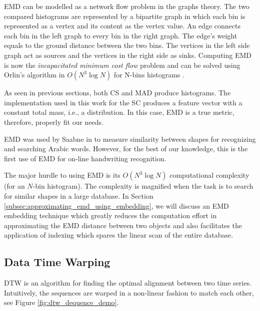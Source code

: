 \iftoggle{edit-mode}{\hspace{0pt}\marginpar{EMD modelling as flow in graph}}{}
EMD can be modelled as a network flow problem in the graphs theory. 
The two compared histograms are represented by a bipartite graph in which each bin is represented as a vertex and its content as the vertex value. 
An edge connects each bin in the left graph to every bin in the right graph. 
The edge's weight equals to the ground distance between the two bins. 
The vertices in the left side graph act as sources and the vertices in the right side as sinks. 
Computing EMD is now the \emph{incapacitated minimum cost flow} problem and can be solved using Orlin's algorithm in $O(N^3 \log N)$ for N-bins histograms \cite{shirdhonkar2008approximate}.

\iftoggle{edit-mode}{\hspace{0pt}\marginpar{EMD in Feature space}}{}
As seen in previous sections, both CS and MAD produce histograms. 
The implementation used in this work for the SC produces a feature vector with a constant total mass, i.e., a distribution. 
In this case, EMD is a true metric, therefore, properly fit our needs.

\iftoggle{edit-mode}{\hspace{0pt}\marginpar{EMD in handwriting recognition}}{}
EMD was used by Saabne in \cite{saabni2013efficient} to measure similarity between shapes for recognizing and searching Arabic words. 
However, for the best of our knowledge, this is the first use of EMD for on-line handwriting recognition.

\iftoggle{edit-mode}{\hspace{0pt}\marginpar{EMD drawback}}{}
The major hurdle to using EMD is its $O\left( {{N^3}\log N} \right)$ computational complexity (for an $N$-bin histogram). 
The complexity is magnified when the task is to search for similar shapes in a large database.  
In Section \ref{subsec:approximating_emd_using_embedding}, we will discuss an EMD embedding technique which greatly reduces the computation effort in approximating the EMD distance between two objects and also facilitates the application of indexing which spares the linear scan of the entire database.



\subsection{Data Time Warping}
\label{subsec:dtw}

\iftoggle{edit-mode}{\hspace{0pt}\marginpar{Introduction}}{}
DTW is an algorithm for finding the optimal alignment between two time series. 
Intuitively, the sequences are warped in a non-linear fashion to match each other, see Figure \ref{fig:dtw_dequence_demo}.\\ 


